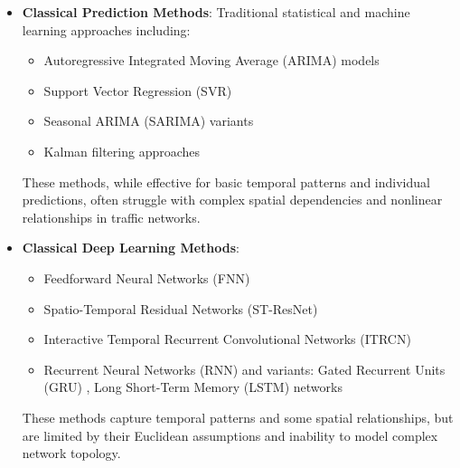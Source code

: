 \documentclass[pdflatex,sn-mathphys-num]{sn-jnl}%
\theoremstyle{thmstyleone}%
\theoremstyle{thmstyletwo}%
\theoremstyle{thmstylethree}%
\begin{document}
\begin{itemize}
\item \textbf{Classical Prediction Methods}: Traditional statistical and machine learning approaches including:
  \begin{itemize}
  \item Autoregressive Integrated Moving Average (ARIMA) models \citep{Hamed1995Short, Fabian2003Modeling}
  \item Support Vector Regression (SVR) \citep{Smola2004A}
  \item Seasonal ARIMA (SARIMA) variants \citep{Lippi2013Short}
  \item Kalman filtering approaches \citep{Ojeda2013Adaptive}
  \end{itemize}
  These methods, while effective for basic temporal patterns and individual predictions, often struggle with complex spatial dependencies and nonlinear relationships in traffic networks.

\item \textbf{Classical Deep Learning Methods}:
  \begin{itemize}
  \item Feedforward Neural Networks (FNN) \citep{Park2010Forecasting}
  \item Spatio-Temporal Residual Networks (ST-ResNet) \citep{Zhang2016Deep}
  \item Interactive Temporal Recurrent Convolutional Networks (ITRCN) \citep{Cao2017Interactive}
  \item Recurrent Neural Networks (RNN) and variants: Gated Recurrent Units (GRU) \citep{Cao2017Interactive}, Long Short-Term Memory (LSTM) networks \citep{Fu2017Using, KHAN20253369}
  \end{itemize}
  These methods capture temporal patterns and some spatial relationships, but are limited by their Euclidean assumptions and inability to model complex network topology.


\end{itemize}
\end{document}
